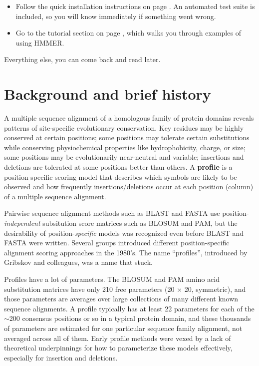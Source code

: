 \begin{itemize}

\item Follow the quick installation instructions on page
  \pageref{chapter:installation}. An automated test suite is included,
  so you will know immediately if something went
  wrong.

\item Go to the tutorial section on page \pageref{chapter:tutorial},
  which walks you through examples of using HMMER.

\end{itemize}

Everything else, you can come back and read later.



\section{Background and brief history}

A multiple sequence alignment of a homologous family of protein
domains reveals patterns of site-specific evolutionary
conservation. Key residues may be highly conserved at certain
positions; some positions may tolerate certain substitutions while
conserving physiochemical properties like hydrophobicity, charge, or
size; some positions may be evolutionarily near-neutral and variable;
insertions and deletions are tolerated at some positions better than
others.  A \textbf{profile} is a position-specific scoring model that
describes which symbols are likely to be observed and how frequently
insertions/deletions occur at each position (column) of a
multiple sequence alignment.

Pairwise sequence alignment methods such as BLAST and FASTA use
position-\emph{independent} subsitution score matrices such as BLOSUM
and PAM, but the desirability of position-\emph{specific} models was
recognized even before BLAST and FASTA were written.\cite{Doolittle81}
Several groups introduced different position-specific alignment
scoring approaches in the 1980's. The name ``profiles'', introduced by
Gribskov and colleagues,\cite{Gribskov87} was a name that stuck.

Profiles have a lot of parameters.  The BLOSUM and PAM amino acid
substitution matrices have only 210 free parameters (20 $\times$ 20,
symmetric), and those parameters are averages over large collections
of many different known sequence alignments. A profile typically has
at least 22 parameters  for each of the $\sim$200 consensus positions or so in a
typical protein domain, and these thousands of parameters are
estimated for one particular sequence family alignment, not averaged
across all of them. Early profile methods were vexed by a lack of
theoretical underpinnings for how to parameterize these models
effectively, especially for insertion and deletions.

